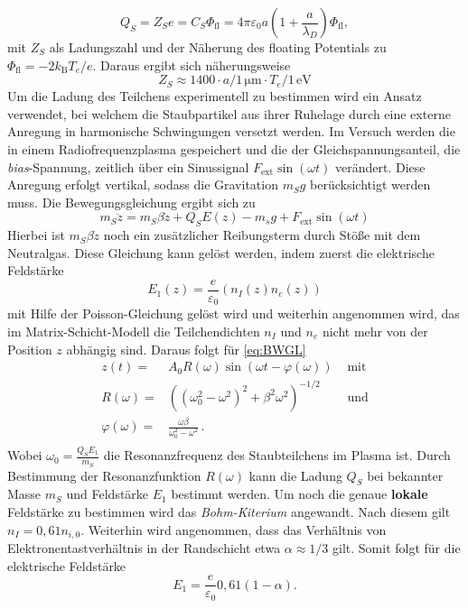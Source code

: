 \documentclass[numbers=noenddot,a4paper,notitlepage,twoside,BCOR15mm]{scrartcl}
\newcommand{\ix}[1]{_\text{#1}}
\begin{document}
		\begin{equation}
			Q_S = Z_S e = C_S \Phi_\mathrm{fl} = 4\pi \varepsilon_0 a\left(1+\frac{a}{\lambda_D}\right)\Phi_\mathrm{fl},
		\end{equation}
		mit $Z_S$ als Ladungszahl und der Näherung des floating Potentials zu $\Phi_\mathrm{fl} = -2k_\mathrm{B}T_e/e$. Daraus ergibt sich näherungsweise
		\begin{equation}
			Z_S \approx 1400\cdot a/1\,\mathrm{\mu m}\cdot T_e/1\,\mathrm{eV}
		\end{equation}
		Um die Ladung des Teilchens experimentell zu bestimmen wird ein Ansatz verwendet, bei welchem die Staubpartikel aus ihrer Ruhelage durch eine externe Anregung in harmonische Schwingungen versetzt werden. Im Versuch werden die in einem Radiofrequenzplasma gespeichert und die der Gleichspannungsanteil, die \textit{bias}-Spannung, zeitlich über ein Sinussignal $F_\mathrm{ext} \sin(\omega t)$ verändert. Diese Anregung erfolgt vertikal, sodass die Gravitation $m_S g$ berücksichtigt werden muss. Die Bewegungsgleichung ergibt sich zu
		\begin{equation}
			\label{eq:BWGL}
			m_S \ddot{z} = m_S \beta \dot{z} + Q_S E(z) - m_s g + F_\mathrm{ext}\sin(\omega t)
		\end{equation}
		Hierbei ist $m_S \beta \dot{z}$ noch ein zusätzlicher Reibungsterm durch Stöße mit dem Neutralgas. Diese Gleichung kann gelöst werden, indem zuerst die elektrische Feldstärke
		\begin{equation}
			E_1(z) = \frac{e}{\varepsilon_0}(n_I(z)n_e(z))
		\end{equation}
		mit Hilfe der Poisson-Gleichung gelöst wird und weiterhin angenommen wird, das im Matrix-Schicht-Modell die Teilchendichten $n_I$ und $n_e$ nicht mehr von der Position $z$ abhängig sind. Daraus folgt für \autoref{eq:BWGL}
		\begin{align}
			z(t)=&A\ix{0}R(\omega)\sin(\omega t-\varphi(\omega)) \,\, &\text{mit} \label{eq:res} \\
			R(\omega)=&\left((\omega\ix{0}^2-\omega^2)^2+\beta^2\omega^2\right)^{-1/2}\,\, &\text{und} \label{eq:antwort} \\
			\varphi(\omega)=&\frac{\omega\beta}{\omega\ix{0}^2-\omega^2}\,. \\
		\end{align}
		Wobei $\omega_0 = \frac{Q_S E_1}{m_S}$ die Resonanzfrequenz des Staubteilchens im Plasma ist. Durch Bestimmung der Resonanzfunktion $R(\omega)$ kann die Ladung $Q_S$ bei bekannter Masse $m_S$ und Feldstärke $E_1$ bestimmt werden. Um noch die genaue \textbf{lokale} Feldstärke zu bestimmen wird das \textit{Bohm-Kiterium} angewandt. Nach diesem gilt $n_I = 0,61 n_{i,0}$. Weiterhin wird angenommen, dass das Verhältnis von Elektronentastverhältnis in der Randschicht etwa $\alpha \approx 1/3$ gilt. Somit folgt für die elektrische Feldstärke
		\begin{equation}
			E_1 = \frac{e}{\varepsilon_0}0,61 (1-\alpha).
		\end{equation}
		
\end{document}
